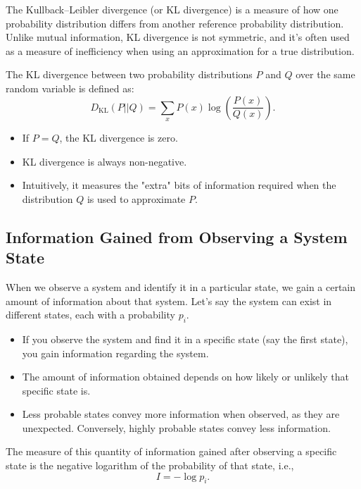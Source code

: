\documentclass[12pt,a4paper]{article}
\newenvironment{defbox}[1][]{%
  \begin{tcolorbox}[enhanced, breakable, colback=defcolor, colframe=green!50!black, title=#1, fonttitle=\bfseries, arc=3pt, boxrule=0.5pt]
}{\end{tcolorbox}}
\newenvironment{rembox}[1][]{%
  \begin{tcolorbox}[enhanced, breakable, colback=gray!5, colframe=gray!50, title=#1, fonttitle=\bfseries, arc=3pt, boxrule=0.5pt]
}{\end{tcolorbox}}
\begin{document}
The Kullback–Leibler divergence (or KL divergence) is a measure of how one probability distribution differs from another reference probability distribution. Unlike mutual information, KL divergence is not symmetric, and it’s often used as a measure of inefficiency when using an approximation for a true distribution.

\begin{defbox}[KL Divergence]
The KL divergence between two probability distributions \( P \) and \( Q \) over the same random variable is defined as:
\[
D_{\mathrm{KL}}(P || Q) = \sum_x P(x) \log \left( \frac{P(x)}{Q(x)} \right).
\]
\end{defbox}

\begin{rembox}[Interpretation]
\begin{itemize}
    \item If \( P = Q \), the KL divergence is zero.
    \item KL divergence is always non-negative.
    \item Intuitively, it measures the "extra" bits of information required when the distribution \( Q \) is used to approximate \( P \).
\end{itemize}
\end{rembox}
\subsection{Information Gained from Observing a System State}

When we observe a system and identify it in a particular state, we gain a certain amount of information about that system. Let's say the system can exist in different states, each with a probability \( p_i \).

\begin{itemize}
    \item If you observe the system and find it in a specific state (say the first state), you gain information regarding the system.
    \item The amount of information obtained depends on how likely or unlikely that specific state is.
    \item Less probable states convey more information when observed, as they are unexpected. Conversely, highly probable states convey less information.
\end{itemize}

The measure of this quantity of information gained after observing a specific state is the negative logarithm of the probability of that state, i.e., 
\[
I = -\log p_i.
\]
\end{document}
